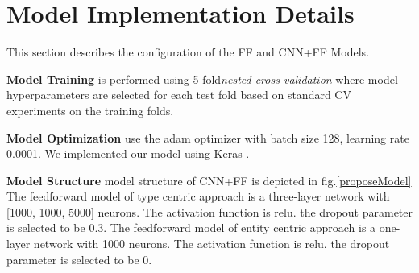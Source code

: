 \section{Model Implementation Details}
This section describes the configuration of the FF and CNN+FF Models.

\textbf{Model Training} is performed using 5 fold\textit{nested cross-validation} \cite{cawley2010over} where model hyperparameters are selected for each test fold based on standard CV experiments on the training folds.

\textbf{Model Optimization} use the adam optimizer with batch size 128, learning rate 0.0001. We implemented our model using Keras \cite{chollet2015keras}.

\textbf{Model Structure} model structure of CNN+FF is depicted in fig.\ref{proposeModel} The feedforward model of type centric approach is a three-layer network with [1000, 1000, 5000] neurons. The activation function is relu. the dropout parameter is selected to be 0.3. The feedforward model of entity centric approach is a one-layer network with 1000 neurons. The activation function is relu. the dropout parameter is selected to be 0.

